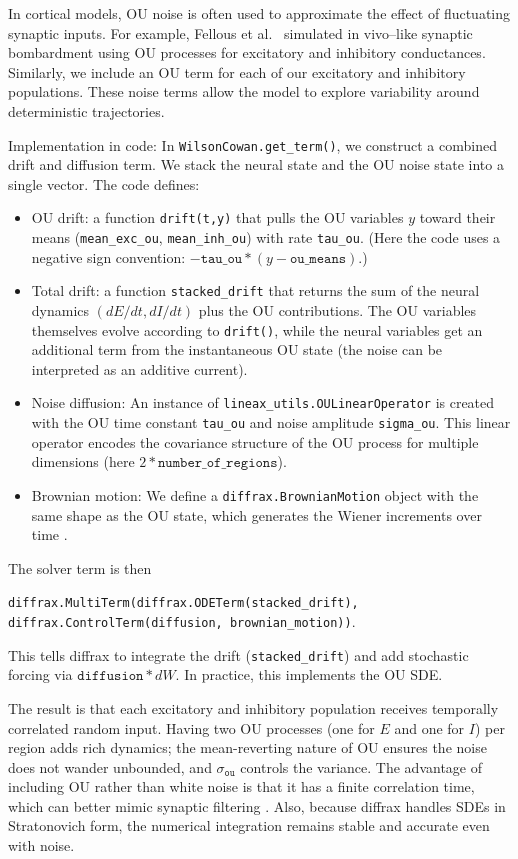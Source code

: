\documentclass[11pt,a4paper]{article}
\begin{document}
In cortical models, OU noise is often used to approximate the effect of fluctuating synaptic inputs. For
example, Fellous et al.\ \cite{fellous2003synaptic} simulated in vivo--like synaptic bombardment using OU processes for
excitatory and inhibitory conductances. Similarly, we include an OU term for each of our excitatory and
inhibitory populations. These noise terms allow the model to explore variability around deterministic
trajectories.

Implementation in code: In \texttt{WilsonCowan.get\_term()}, we construct a combined drift and diffusion
term. We stack the neural state and the OU noise state into a single vector. The code defines:

\begin{itemize}
\item OU drift: a function \texttt{drift(t,y)} that pulls the OU variables $y$ toward their means
(\texttt{mean\_exc\_ou}, \texttt{mean\_inh\_ou}) with rate \texttt{tau\_ou}. (Here the code uses a
negative sign convention: $-\texttt{tau\_ou} * (y - \texttt{ou\_means})$.)
\item Total drift: a function \texttt{stacked\_drift} that returns the sum of the neural dynamics
$(dE/dt, dI/dt)$ plus the OU contributions. The OU variables themselves evolve according to
\texttt{drift()}, while the neural variables get an additional term from the instantaneous OU state (the
noise can be interpreted as an additive current).
\item Noise diffusion: An instance of \texttt{lineax\_utils.OULinearOperator} is created with the OU
time constant \texttt{tau\_ou} and noise amplitude \texttt{sigma\_ou}. This linear operator encodes the
covariance structure of the OU process for multiple dimensions (here
$2 * \texttt{number\_of\_regions}$).
\item Brownian motion: We define a \texttt{diffrax.BrownianMotion} object with the same shape as the
OU state, which generates the Wiener increments over time \cite{kidger2021neural}.
\end{itemize}

The solver term is then

\texttt{diffrax.MultiTerm(diffrax.ODETerm(stacked\_drift),
diffrax.ControlTerm(diffusion, brownian\_motion))}.

This tells diffrax to integrate the drift (\texttt{stacked\_drift}) and add stochastic forcing via
$\texttt{diffusion} * dW$. In practice, this implements the OU SDE.

The result is that each excitatory and inhibitory population receives temporally correlated random input.
Having two OU processes (one for $E$ and one for $I$) per region adds rich dynamics; the mean-reverting
nature of OU ensures the noise does not wander unbounded, and $\sigma_{\texttt{ou}}$ controls the
variance. The advantage of including OU rather than white noise is that it has a finite correlation time,
which can better mimic synaptic filtering \cite{fellous2003synaptic}. Also, because diffrax handles SDEs in Stratonovich form, the
numerical integration remains stable and accurate even with noise.
\end{document}
